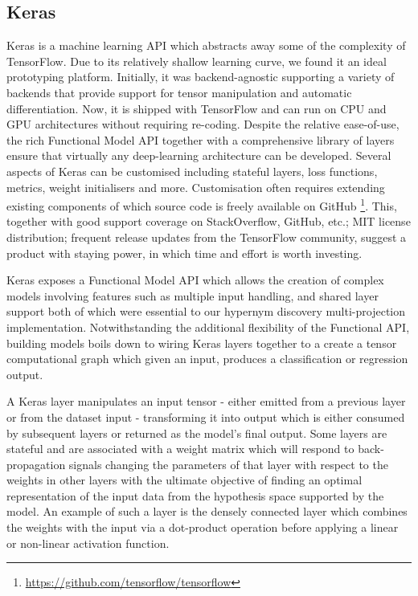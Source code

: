 \subsection{Keras}
Keras is a machine learning API which abstracts away some of the complexity of TensorFlow.  Due to its relatively shallow learning curve, we found it an ideal prototyping platform.  Initially, it was backend-agnostic supporting a variety of backends that provide support for tensor manipulation and automatic differentiation.  Now, it is shipped with TensorFlow and can run on CPU and GPU architectures without requiring re-coding.  Despite the relative ease-of-use, the rich Functional Model API together with a comprehensive library of layers ensure that virtually any deep-learning architecture can be developed.  Several aspects of Keras can be customised including stateful layers, loss functions, metrics, weight initialisers and more.  Customisation often requires extending existing components of which source code is freely available on GitHub \footnote{\url{https://github.com/tensorflow/tensorflow}}.  This, together with good support coverage on StackOverflow, GitHub, etc.; MIT license distribution; frequent release updates from the TensorFlow community, suggest a product with staying power, in which time and effort is worth investing.

Keras exposes a Functional Model API which allows the creation of complex models involving features such as multiple input handling, and shared layer support both of which were essential to our hypernym discovery multi-projection implementation.  Notwithstanding the additional flexibility of the Functional API, building models boils down to wiring Keras layers together to a create a tensor computational graph which given an input, produces a classification or regression output.  

A Keras layer manipulates an input tensor - either emitted from a previous layer or from the dataset input - transforming it into output which is either consumed by subsequent layers or returned as the model's final output.  Some layers are stateful and are associated with a weight matrix which will respond to back-propagation signals changing the parameters of that layer with respect to the weights in other layers with the ultimate objective of finding an optimal representation of the input data from the hypothesis space supported by the model.  An example of such a layer is the densely connected layer which combines the weights with the input via a dot-product operation before applying a linear or non-linear activation function.  

